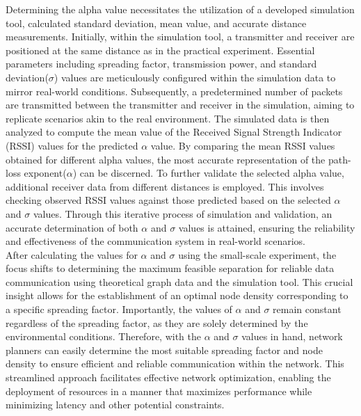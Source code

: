 Determining the alpha value necessitates the utilization of a developed simulation tool, calculated standard deviation, mean value, and accurate distance measurements. Initially, within the simulation tool, a transmitter and receiver are positioned at the same distance as in the practical experiment. Essential parameters including spreading factor, transmission power, and standard deviation($\sigma$) values are meticulously configured within the simulation data to mirror real-world conditions. Subsequently, a predetermined number of packets are transmitted between the transmitter and receiver in the simulation, aiming to replicate scenarios akin to the real environment. The simulated data is then analyzed to compute the mean value of the Received Signal Strength Indicator (RSSI) values for the predicted $\alpha$ value. By comparing the mean RSSI values obtained for different alpha values, the most accurate representation of the path-loss exponent($\alpha$) can be discerned. To further validate the selected alpha value, additional receiver data from different distances is employed. This involves checking observed RSSI values against those predicted based on the selected $\alpha$ and $\sigma$ values. Through this iterative process of simulation and validation, an accurate determination of both $\alpha$ and $\sigma$ values is attained, ensuring the reliability and effectiveness of the communication system in real-world scenarios.\\

After calculating the values for $\alpha$ and $\sigma$ using the small-scale experiment, the focus shifts to determining the maximum feasible separation for reliable data communication using theoretical graph data and the simulation tool. This crucial insight allows for the establishment of an optimal node density corresponding to a specific spreading factor. Importantly, the values of $\alpha$ and $\sigma$ remain constant regardless of the spreading factor, as they are solely determined by the environmental conditions. Therefore, with the $\alpha$ and $\sigma$ values in hand, network planners can easily determine the most suitable spreading factor and node density to ensure efficient and reliable communication within the network. This streamlined approach facilitates effective network optimization, enabling the deployment of resources in a manner that maximizes performance while minimizing latency and other potential constraints.


